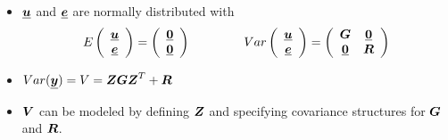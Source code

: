 \begin{frame}
  \begin{itemize}
    \vspace{0.5cm}
    \item $ \boldsymbol{\underline{u}} $ and $ \boldsymbol{\underline{e}} $ are normally distributed with
      $$ 
        E\left(
          \begin{array}{c} 
            \boldsymbol{\underline{u}} \\
            \boldsymbol{\underline{e}} \\  
          \end{array}
        \right) = \left(
          \begin{array}{c} 
            \boldsymbol{\underline{0}} \\
            \boldsymbol{\underline{0}} \\ 
          \end{array}
        \right)
        \hspace{1.5cm}
        Var\left(
          \begin{array}{c} 
            \boldsymbol{\underline{u}} \\
            \boldsymbol{\underline{e}} \\  
          \end{array}
        \right) = \left(
          \begin{array}{cc} 
            \boldsymbol{G} & \boldsymbol{\underline{0}} \\
            \boldsymbol{\underline{0}} & \boldsymbol{R} \\ 
          \end{array}
        \right)        
      $$
    \vspace{0.5cm}
    \item $ Var(\boldsymbol{\underline{y}}) = V = \boldsymbol{Z} \boldsymbol{G} \boldsymbol{Z}^T + \boldsymbol{R} $
    \vspace{0.75cm}
    \item $ \boldsymbol{V} $ can be modeled by defining $ \boldsymbol{Z} $ and specifying covariance structures for $ \boldsymbol{G} $ and $ \boldsymbol{R} $.
  \end{itemize}
\end{frame}




